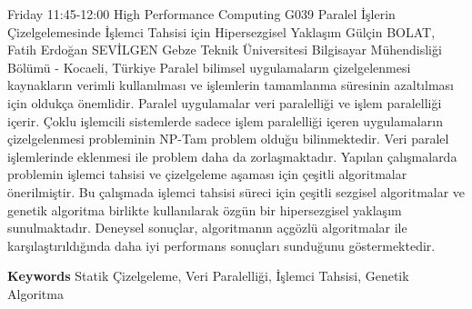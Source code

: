 
    \begin{abstract_basarim}
    {Friday 11:45-12:00}
    {High Performance Computing}
    {G039}
    {Paralel İşlerin Çizelgelemesinde İşlemci Tahsisi için Hipersezgisel Yaklaşım}
    {%
    Gülçin BOLAT, Fatih Erdoğan SEVİLGEN}
    {%
    }
    {%
    Gebze Teknik Üniversitesi Bilgisayar Mühendisliği Bölümü - Kocaeli, Türkiye}
    Paralel bilimsel uygulamaların çizelgelenmesi kaynakların verimli kullanılması ve işlemlerin tamamlanma süresinin azaltılması için oldukça önemlidir. Paralel uygulamalar veri paralelliği ve işlem paralelliği içerir. Çoklu işlemcili sistemlerde sadece işlem paralelliği içeren uygulamaların çizelgelenmesi probleminin NP-Tam problem olduğu bilinmektedir. Veri paralel işlemlerinde eklenmesi ile problem daha da zorlaşmaktadır. Yapılan çalışmalarda problemin işlemci tahsisi ve çizelgeleme aşaması için çeşitli algoritmalar önerilmiştir. Bu çalışmada işlemci tahsisi süreci için çeşitli sezgisel algoritmalar ve genetik algoritma birlikte kullanılarak özgün bir hipersezgisel yaklaşım sunulmaktadır. Deneysel sonuçlar, algoritmanın açgözlü algoritmalar ile karşılaştırıldığında daha iyi performans sonuçları sunduğunu göstermektedir. 
    
        \textbf{Keywords} \newline{}Statik Çizelgeleme, Veri Paralelliği, İşlemci Tahsisi, Genetik Algoritma
    \end{abstract_basarim}
    